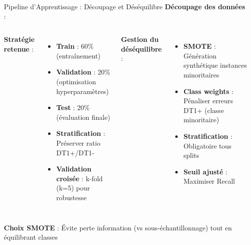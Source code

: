 \documentclass[11pt, aspectratio=169]{beamer}
\begin{document}
\begin{frame}{Pipeline d'Apprentissage : Découpage et Déséquilibre}
  \textbf{\color{accent2} Découpage des données} :
  
  \vspace{0.6em}
  
  \begin{columns}[T]
    \textbf{Stratégie retenue} :
    \begin{itemize}
      \item \textbf{Train} : 60\% (entraînement)
      \item \textbf{Validation} : 20\% (optimisation hyperparamètres)
      \item \textbf{Test} : 20\% (évaluation finale)
      \item \textbf{Stratification} : Préserver ratio DT1+/DT1-
      \item \textbf{Validation croisée} : k-fold (k=5) pour robustesse
    \end{itemize}
    
    \textbf{Gestion du déséquilibre} :
    \begin{itemize}
      \item \textbf{SMOTE} : Génération synthétique instances minoritaires
      \item \textbf{Class weights} : Pénaliser erreurs DT1+ (classe minoritaire)
      \item \textbf{Stratification} : Obligatoire tous splits
      \item \textbf{Seuil ajusté} : Maximiser Recall
    \end{itemize}
  \end{columns}
  
  \vspace{1em}
  
  \textbf{\textcolor{accent1}{Choix SMOTE}} : Évite perte information (vs sous-échantillonnage) tout en équilibrant classes
\end{frame}
\end{document}
